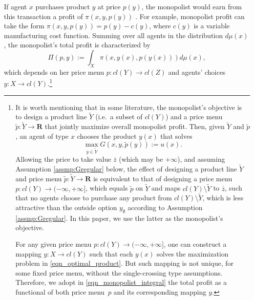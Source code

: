 \documentclass[a4paper, 11pt]{amsart}
\numberwithin{equation}{section}
\theoremstyle{plain}
\theoremstyle{definition}
\theoremstyle{remark}
\newcommand{\R}{\mathbf{R}}
\begin{document}
If agent $x$ purchases product $y$ at price $p(y)$, the monopolist would earn from this transaction a profit of $\pi(x,y,p(y))$%
.  {For example, monopolist profit can take the form $\pi(x,y,p(y)) = p(y)-c(y)$, where %
$c(y)$ is a variable manufacturing cost function.} Summing over all agents in the distribution $d\mu(x)$, the monopolist's total profit is characterized by 
\begin{equation}\label{eqn_monopolist_integral}
	\Pi(p, y):=\int_{X} \pi(x, y(x), p(y(x))) d\mu(x),
\end{equation}
which depends on her price menu $p: cl(Y) \longrightarrow cl(Z)$ and  agents' choices $y: X \longrightarrow cl(Y)$.\footnote{It is worth mentioning that in some literature, the monopolist's objective is to design a product line $\tilde{Y}$ (i.e.~a subset of $cl(Y)$) and a price menu $\tilde{p}: \tilde{Y} \longrightarrow \R$ that jointly maximize overall monopolist profit. Then, given $\tilde{Y}$ and $\tilde{p}$, an agent of type $x$ chooses the product $y(x)$ that solves
	\begin{equation*}
		\max_{y \in \tilde{Y}} G(x,y, \tilde{p}(y)):= u(x).
	\end{equation*}
Allowing the price to take value $\bar{z}$ (which may be $+\infty$), and assuming Assumption \ref{assmp:Gregular} below, the effect of designing a product line $\tilde{Y}$ and price menu $\tilde{p}: \tilde{Y}\longrightarrow \R$ is equivalent to that of designing a price menu $p : cl(Y)\longrightarrow (-\infty, +\infty]$, which equals $\tilde{p}$ on $\tilde{Y}$ and maps $cl(Y) \setminus \tilde{Y}$ to $\bar{z}$, such that no agents choose to purchase any product from $cl(Y) \setminus \tilde{Y}$, which is less attractive than the outside option $y_{\emptyset}$ according to Assumption \ref{assmp:Gregular}. In this paper, we use the latter as the monopolist's objective.
 \vspace{0.1cm}
 
For any given price menu $p: cl(Y)\longrightarrow (-\infty, +\infty]$, one can construct a mapping $y: X \longrightarrow cl(Y)$ such that each $y(x)$ solves the maximization problem in \eqref{eqn_optimal_product}. But such mapping is not unique, for some fixed price menu, without the single-crossing type assumptions. %
Therefore, we adopt in \eqref{eqn_monopolist_integral} the total profit as a functional of both price menu~$p$ and its corresponding mapping $y$.}\medskip
\end{document}
